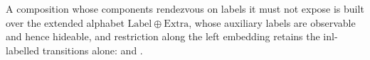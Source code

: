 \begin{definition}
  \label{def:relabel}
  \leanok
  A composition whose components rendezvous on labels it must not expose is built over the extended alphabet $\mathrm{Label} \oplus \mathrm{Extra}$, whose auxiliary labels are observable and hence hideable, and restriction along the left embedding retains the $\mathrm{inl}$-labelled transitions alone:  and .
\end{definition}
